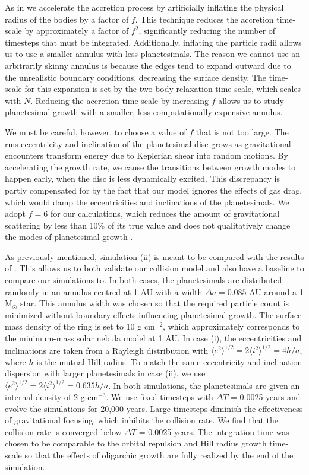 As in \cite{kokubo96, kokubo98} we accelerate the accretion process by artificially inflating the physical radius of the bodies by 
a factor of $f$. This technique reduces the accretion time-scale by approximately a factor of $f^{2}$, significantly reducing the 
number of timesteps that must be integrated. Additionally, inflating the particle radii allows us to use a smaller annulus with less 
planetesimals. The reason we cannot use an arbitrarily skinny annulus is because the edges tend to expand outward due to the 
unrealistic boundary conditions, decreasing the surface density. The time-scale for this expansion is set by the two body 
relaxation time-scale, which scales with $N$. Reducing the accretion time-scale by increasing $f$ allows us to study 
planetesimal growth with a smaller, less computationally expensive annulus.

We must be careful, however, to choose a value of $f$ that is not too large. The rms eccentricity and inclination of the 
planetesimal disc grows as gravitational encounters transform energy due to Keplerian shear into random motions. By 
accelerating the growth rate, we cause the transitions between growth modes to happen early, when the disc is less dynamically 
excited. This discrepancy is partly compensated for by the fact that our model ignores the effects of gas drag, which would damp 
the eccentricities and inclinations of the planetesimals. We adopt $f=6$ for our calculations, which reduces the amount of 
gravitational scattering by less than 10\% of its true value and does not qualitatively change the modes of planetesimal growth 
\cite{kokubo98}.

\noindent As previously mentioned, simulation (ii) is meant to be compared with the results of \cite{kokubo98}. This allows us to 
both validate our collision model and also have a baseline to compare our simulations to. In both cases, the planetesimals are 
distributed randomly in an annulus centred at 1 AU with a width $\Delta a = 0.085$ AU around a 1 $\mathrm{M_{\odot}}$ star. 
This annulus width was chosen so that the required particle count is minimized without boundary effects influencing planetesimal 
growth. The surface mass density of the ring is set to 10 g cm$^{-2}$, which approximately corresponds to the minimum-mass 
solar nebula model \cite{hayashi81} at 1 AU. In case (i), the eccentricities and inclinations are taken from a Rayleigh distribution 
\cite{ida92} with $\langle e^2 \rangle^{1/2} = 2 \langle i^2 \rangle^{1/2} = 4 h/a$, where $h$ is the mutual Hill radius. To match 
the same eccentricity and inclination dispersion with larger planetesimals in case (ii), we use $\langle e^2 \rangle^{1/2} = 2 
\langle i^2 \rangle^{1/2} = 0.635 h/a$. In both simulations, the planetesimals are given an internal density of 2 g cm$^{-3}$. We 
use fixed timesteps with $\Delta T$ = 0.0025 years and evolve the simulations for 20,000 years. Large timesteps diminish the 
effectiveness of gravitational focusing, which inhibits the collision rate. We find that the collision rate is converged below $\Delta 
T$ = 0.0025 years. The integration time was chosen to be comparable to the orbital repulsion and Hill radius growth time-scale 
\cite{kokubo95} so that the effects of oligarchic growth are fully realized by the end of the simulation.

